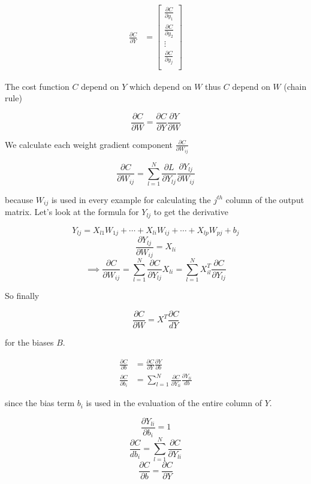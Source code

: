 \documentclass[a4paper, twocolumn, twoside]{article}
\begin{document}
	\begin{align}
		\frac{\partial C}{\partial Y} &= \begin{bmatrix}
		\frac{\partial C}{\partial y_1} \\
		\frac{\partial C}{\partial y_2} \\
        \vdots \\
	   \frac{\partial C}{\partial y_j} \\
	\end{bmatrix}
	\end{align}

	The cost function $C$ depend on $Y$ which depend on $W$ thus $C$ depend on $W$ (chain rule)

	$$
    \frac{\partial C}{\partial W} = \frac{\partial C}{\partial Y} \frac{\partial Y}{\partial W}
	$$

	We calculate each weight gradient component $\frac{\partial C }{\partial W_{ij}}$

	$$
    \frac{\partial C}{\partial W_{ij}} = \sum_{l=1}^{N} \frac{\partial L}{\partial Y_{lj}} \frac{\partial Y_{lj}}{\partial W_{ij}}
	$$

	because $W_{ij}$ is used in every example for calculating the $j^{th}$ column of the output matrix. Let's look at the formula for $Y_{lj}$ to get the derivative

	$$
		Y_{lj} = X_{l1}W_{1j} + \cdots + X_{li}W_{ij} + \cdots + X_{lp}W_{pj} + b_{j}
	$$
	$$
		\frac{\partial Y_{lj}}{\partial W_{ij}} = X_{li}
	$$
	$$
		\implies \frac{\partial C}{\partial W_{ij}} = \sum_{l=1}^{N} \frac{\partial C}{\partial Y_{lj}} X_{li} = \sum_{l=1}^{N} X^{T}_{il}\frac{\partial C}{\partial Y_{lj}}
	$$

	So finally 

	$$
		\frac{\partial C}{\partial W} = X^{T} \frac{\partial C}{dY}
	$$

	for the biases $B$.

	\begin{align}
		\frac{\partial C}{\partial b} &= \frac{\partial C}{\partial Y} \frac{\partial Y}{\partial b}\\
		\frac{\partial C}{\partial b_{i}} &= \sum_{l=1}^{N} \frac{\partial C}{\partial Y_{li}} \frac{\partial Y_{li}}{db}
	\end{align}

	since the bias term $b_{i}$ is used in the evaluation of the entire column of $Y$.

	$$
		\frac{\partial Y_{li}}{\partial b_{i}} = 1
	$$
	$$
		\frac{\partial C}{db_{i}} = \sum_{l=1}^{N} \frac{\partial C}{\partial Y_{li}}
	$$
	$$
		\frac{\partial C}{\partial b} = \frac{\partial C}{\partial Y}
	$$
\end{document}
